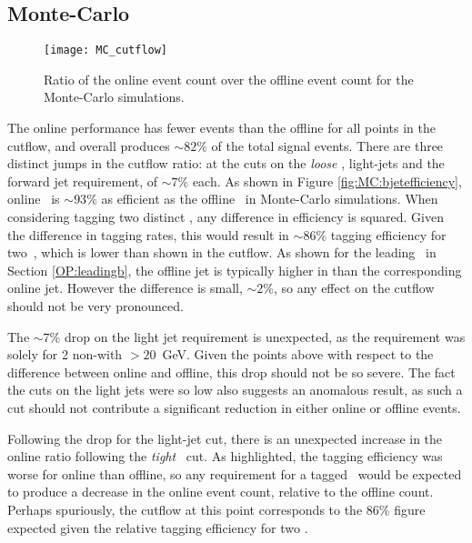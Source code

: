     \subsection{Monte-Carlo}
        \begin{figure}[h]
            \centering
            \texttt{[image: MC\_cutflow]}
            \caption[\VBFHBB\ Cutflow ratio for Monte-Carlo simulation]{Ratio of the online event count over the offline event count for the Monte-Carlo simulations.}
            \label{f:cutflowMC}
        \end{figure}

    The online performance has fewer events than the offline for all points in the cutflow, and overall produces $\sim82\%$ of the total signal events. There are three distinct jumps in the cutflow ratio: at the cuts on the \textit{loose} \bjets, light-jets and the forward jet requirement, of $\sim7\%$ each. As shown in Figure \ref{fig:MC:bjetefficiency}, online \btag\, is $\sim93\%$ as efficient as the offline \btag\ in Monte-Carlo simulations. When considering tagging two distinct \bjets, any difference in efficiency is squared. Given the difference in tagging rates, this would result in $\sim86\%$ tagging efficiency for two \bjets\,, which is lower than shown in the cutflow. As shown for the leading \bjet\ in Section \ref{OP:leadingb}, the offline jet is typically higher in \pt than the corresponding online jet. However the difference is small, $\sim2\%$, so any effect on the cutflow should not be very pronounced.

    The $\sim7\%$ drop on the light jet requirement is unexpected, as the requirement was solely for 2 non-\bjets with \pt$>20$~GeV. Given the points above with respect to the \pt difference between online and offline, this drop should not be so severe. The fact the \pt cuts on the light jets were so low also suggests an anomalous result, as such a cut should not contribute a significant reduction in either online or offline events.

    Following the drop for the light-jet cut, there is an unexpected increase in the online ratio following the \textit{tight} \btagging\, cut. As highlighted, the tagging efficiency was worse for online than offline, so any requirement for a tagged \bjet\, would be expected to produce a decrease in the online event count, relative to the offline count. Perhaps spuriously, the cutflow at this point corresponds to the $86\%$ figure expected given the relative tagging efficiency for two \bjets.

